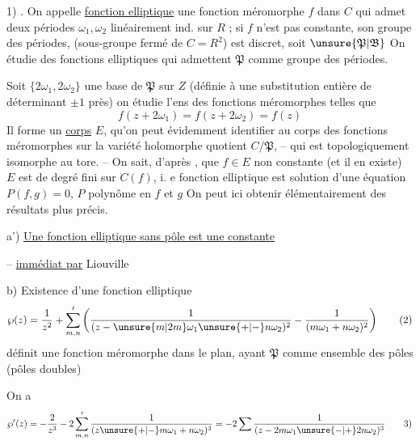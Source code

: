 \begin{center}\end{center}


1) . On appelle \uline{fonction elliptique} une fonction méromorphe $f$ dans $C$ qui admet deux périodes $\omega_1,\omega_2$ linéairement ind. sur $R$ ; si $f$ n'est pas constante, son groupe des périodes, (sous-groupe fermé de $C=R^2$) est discret, soit $\unsure{\mathfrak P|\mathfrak B}$ On étudie  des fonctions elliptiques qui admettent $\mathfrak P$ comme groupe des périodes.

 Soit $\{2\omega_1,2\omega_2\}$ une base de $\mathfrak P$ sur $Z$ (définie à une substitution entière de déterminant $\pm1$ près) on étudie l'ens des fonctions méromorphes telles que
\[
f(z+2\omega_1)=f(z+2\omega_2)=f(z)\tag*{(1)}
\]
Il forme un \uline{corps} $E$, qu'on peut évidemment identifier au corps des fonctions méromorphes sur la variété holomorphe quotient $C/\mathfrak P$, -- qui est topologiquement isomorphe au tore. -- On sait, d'après    , que    $f\in E$ non constante  (et il en existe)  $E$ est de degré fini sur $C(f)$, i. e  fonction elliptique  est  solution d'une équation $P(f,g)=0$, $P$ polynôme en $f$ et $g$  On peut ici obtenir élémentairement des résultats plus précis.

a')  \uline{Une fonction elliptique sans pôle est une constante}

-- \uline{immédiat par} Liouville


b) Existence d'une fonction elliptique 
\[
\wp(z)=\frac{1}{z^2}+\sum_{m,n}'\left(\frac{1}{(z-\unsure{m|2m}\omega_1\unsure{+|-}n\omega_2)^2}-\frac{1}{(m\omega_1+n\omega_2)^2}\right)\tag*{(2)}
\]
définit une fonction méromorphe dans  le plan, ayant  $\mathfrak P$ comme ensemble des pôles (pôles doubles)

On a
\[
\wp'(z)=-\frac{2}{z^3}-2\sum_{m,n}'\frac{1}{(z\unsure{+|-}m\omega_1+n\omega_2)^3}
=-2\sum\frac{1}{(z-2m\omega_1\unsure{-|+}2n\omega_2)^3}\tag*{3)}
\]

